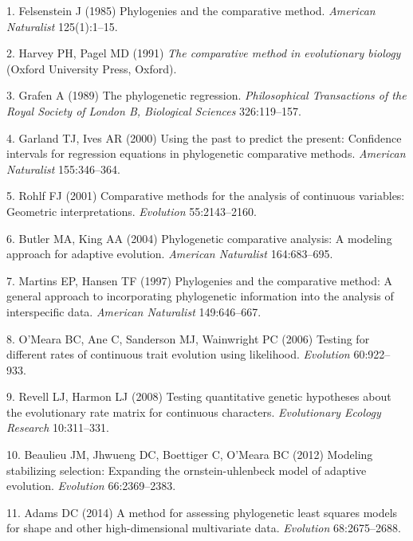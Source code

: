 \documentclass[9pt,twocolumn,twoside,lineno]{pnas-new}
\begin{document}
\hypertarget{refs}{}
\leavevmode\hypertarget{ref-Felsenstein1985}{}%
1. Felsenstein J (1985) Phylogenies and the comparative method.
\emph{American Naturalist} 125(1):1--15.

\leavevmode\hypertarget{ref-HarveyPagel1991}{}%
2. Harvey PH, Pagel MD (1991) \emph{The comparative method in
evolutionary biology} (Oxford University Press, Oxford).

\leavevmode\hypertarget{ref-Grafen1989}{}%
3. Grafen A (1989) The phylogenetic regression. \emph{Philosophical
Transactions of the Royal Society of London B, Biological Sciences}
326:119--157.

\leavevmode\hypertarget{ref-GarlandIves2000}{}%
4. Garland TJ, Ives AR (2000) Using the past to predict the present:
Confidence intervals for regression equations in phylogenetic
comparative methods. \emph{American Naturalist} 155:346--364.

\leavevmode\hypertarget{ref-Rohlf2001}{}%
5. Rohlf FJ (2001) Comparative methods for the analysis of continuous
variables: Geometric interpretations. \emph{Evolution} 55:2143--2160.

\leavevmode\hypertarget{ref-ButlerKing2004}{}%
6. Butler MA, King AA (2004) Phylogenetic comparative analysis: A
modeling approach for adaptive evolution. \emph{American Naturalist}
164:683--695.

\leavevmode\hypertarget{ref-MartinsHansen1997}{}%
7. Martins EP, Hansen TF (1997) Phylogenies and the comparative method:
A general approach to incorporating phylogenetic information into the
analysis of interspecific data. \emph{American Naturalist} 149:646--667.

\leavevmode\hypertarget{ref-OMeara_et_al2006}{}%
8. O'Meara BC, Ane C, Sanderson MJ, Wainwright PC (2006) Testing for
different rates of continuous trait evolution using likelihood.
\emph{Evolution} 60:922--933.

\leavevmode\hypertarget{ref-RevellHarmon2008}{}%
9. Revell LJ, Harmon LJ (2008) Testing quantitative genetic hypotheses
about the evolutionary rate matrix for continuous characters.
\emph{Evolutionary Ecology Research} 10:311--331.

\leavevmode\hypertarget{ref-Beaulieu_et_al2012}{}%
10. Beaulieu JM, Jhwueng DC, Boettiger C, O'Meara BC (2012) Modeling
stabilizing selection: Expanding the ornstein-uhlenbeck model of
adaptive evolution. \emph{Evolution} 66:2369--2383.

\leavevmode\hypertarget{ref-Adams2014b}{}%
11. Adams DC (2014) A method for assessing phylogenetic least squares
models for shape and other high-dimensional multivariate data.
\emph{Evolution} 68:2675--2688.
\end{document}
